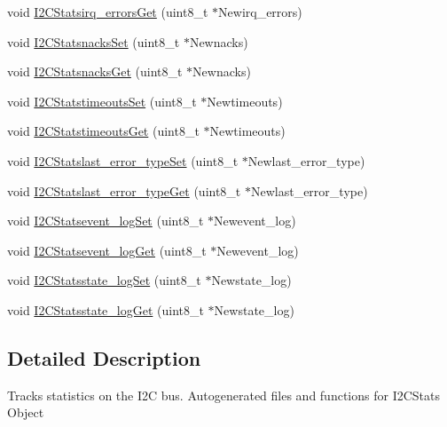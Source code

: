 \begin{DoxyCompactItemize}
\item 
void \hyperlink{group___i2_c_stats_gae59d3be76fd580db89d2e76ae1f75578}{\-I2\-C\-Statsirq\-\_\-errors\-Get} (uint8\-\_\-t $\ast$\-Newirq\-\_\-errors)
\item 
void \hyperlink{group___i2_c_stats_ga36cb9c01bf51136c97329b368499e27c}{\-I2\-C\-Statsnacks\-Set} (uint8\-\_\-t $\ast$\-Newnacks)
\item 
void \hyperlink{group___i2_c_stats_ga18c9f2180429da6734e03d5dbcfc56a7}{\-I2\-C\-Statsnacks\-Get} (uint8\-\_\-t $\ast$\-Newnacks)
\item 
void \hyperlink{group___i2_c_stats_ga2f726ff5433b1f4ce26b429a89ab3616}{\-I2\-C\-Statstimeouts\-Set} (uint8\-\_\-t $\ast$\-Newtimeouts)
\item 
void \hyperlink{group___i2_c_stats_gaa8c7363323b277ccc11bfe60f71e1913}{\-I2\-C\-Statstimeouts\-Get} (uint8\-\_\-t $\ast$\-Newtimeouts)
\item 
void \hyperlink{group___i2_c_stats_ga5e47540366103e4740e7189382749daf}{\-I2\-C\-Statslast\-\_\-error\-\_\-type\-Set} (uint8\-\_\-t $\ast$\-Newlast\-\_\-error\-\_\-type)
\item 
void \hyperlink{group___i2_c_stats_ga67ae845afc19b2f9257dbc8ece96210f}{\-I2\-C\-Statslast\-\_\-error\-\_\-type\-Get} (uint8\-\_\-t $\ast$\-Newlast\-\_\-error\-\_\-type)
\item 
void \hyperlink{group___i2_c_stats_gac0cb4a0a9ddf33586923d6ef433ebd47}{\-I2\-C\-Statsevent\-\_\-log\-Set} (uint8\-\_\-t $\ast$\-Newevent\-\_\-log)
\item 
void \hyperlink{group___i2_c_stats_ga8aaf332583fd0234f15a976dd0655942}{\-I2\-C\-Statsevent\-\_\-log\-Get} (uint8\-\_\-t $\ast$\-Newevent\-\_\-log)
\item 
void \hyperlink{group___i2_c_stats_ga6fed53801a24dfa99a525d004275cccd}{\-I2\-C\-Statsstate\-\_\-log\-Set} (uint8\-\_\-t $\ast$\-Newstate\-\_\-log)
\item 
void \hyperlink{group___i2_c_stats_gae043c0601fd8dc3db50668d026fbdf9b}{\-I2\-C\-Statsstate\-\_\-log\-Get} (uint8\-\_\-t $\ast$\-Newstate\-\_\-log)
\end{DoxyCompactItemize}


\subsection{\-Detailed \-Description}
\-Tracks statistics on the \-I2\-C bus. \-Autogenerated files and functions for \-I2\-C\-Stats \-Object 

